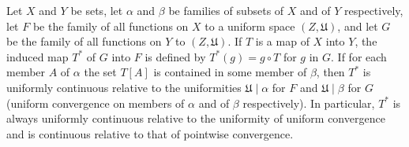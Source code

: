 Let $X$ and $Y$ be sets, let $\alpha$ and $\beta$ be families of subsets of $X$ and of $Y$ respectively, let $F$ be the family of all functions on $X$ to a uniform space $(Z, \mathfrak{U})$, and let $G$ be the family of all functions on $Y$ to $(Z, \mathfrak{U})$. If $T$ is a map of $X$ into $Y$, the induced map $T^*$ of $G$ into $F$ is defined by $T^*(g) = g \circ T$ for $g$ in $G$. If for each member $A$ of $\alpha$ the set $T[A]$ is contained in some member of $\beta$, then $T^*$ is uniformly continuous relative to the uniformities $\mathfrak{U} \mid \alpha$ for $F$ and $\mathfrak{U} \mid \beta$ for $G$ (uniform convergence on members of $\alpha$ and of $\beta$ respectively). In particular, $T^*$ is always uniformly continuous relative to the uniformity of uniform convergence and is continuous relative to that of pointwise convergence.
